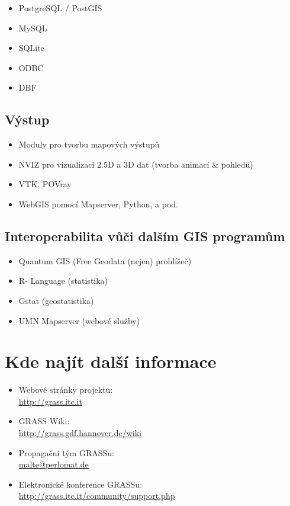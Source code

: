 \documentclass[notumble,a4paper,10pt,nofoldmark]{leaflet}
\newcommand{\GRASSurl}{\url{http://grass.itc.it}}
\begin{document}
\begin{itemize}
\item PostgreSQL / PostGIS
\item MySQL
\item SQLite
\item ODBC
\item DBF
\end{itemize}

\subsection{Výstup}

\begin{itemize}
\item Moduly pro tvorbu mapových výstupů
\item NVIZ pro vizualizaci 2.5D a 3D dat (tvorba animací \& pohledů)
\item VTK, POVray
\item WebGIS pomocí Mapserver, Python, a pod.
\end{itemize}

\subsection{Interoperabilita vůči dalším  GIS programům}

\begin{itemize}
\item Quantum GIS (Free Geodata (nejen) prohlížeč)
\item R- Language (statistika)
\item Gstat (geostatistika)
\item UMN Mapserver (webové služby)
\end{itemize}

\section{Kde najít další informace}

\begin{itemize}
\item{Webové stránky projektu: \\\GRASSurl}
\item{GRASS Wiki: \\\url{http://grass.gdf.hannover.de/wiki}}
\item{Propagační tým GRASSu: \\\url{malte@perlomat.de}}
\item{Elektronické konference GRASSu: \\\url{http://grass.itc.it/community/support.php}}
\end{itemize}
\end{document}

